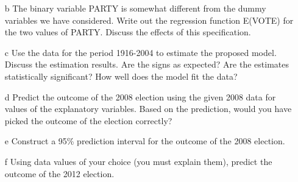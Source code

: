\documentclass[xcolor={dvipsnames}]{beamer}
\begin{document}
\begin{frame}[allowframebreaks]{7.14}
\begin{itemize}
	\item[b] The binary variable PARTY is somewhat different from the dummy variables we have considered. Write out the regression function E(VOTE) for the two values of PARTY. Discuss the effects of this specification.
	\item[c] Use the data for the period 1916-2004 to estimate the proposed model. Discuss the estimation results. Are the signs as expected? Are the estimates statistically significant? How well does the model fit the data? 
	
	\item[d] Predict the outcome of the 2008 election using the given 2008 data for values of the explanatory variables. Based on the prediction, would you have picked the outcome of the election correctly?
	
	\item[e] Construct a 95\% prediction interval for the outcome of the 2008 election. 
	
	\item[f] Using data values of your choice (you must explain them), predict the outcome of the 2012 election.
\end{itemize}

\end{frame}
\end{document}
